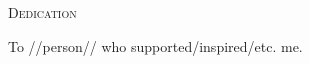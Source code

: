 \vspace*{\fill}
\begin{center}
{\LARGE\textsc{Dedication}}\vspace{0.5cm}

To //person// who supported/inspired/etc. me.

\end{center}
\vspace{\fill}
